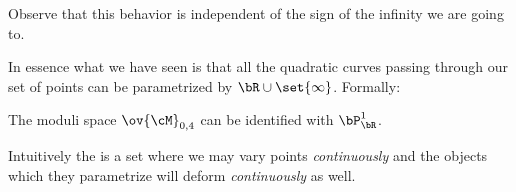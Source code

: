 \documentclass[12pt]{memoir}
\begin{document}
Observe that this behavior is independent of the sign of the infinity we are going to.\par 
In essence what we have seen is that all the quadratic curves passing through our set of points can be parametrized by $\bR\cup\set{\infty}$. Formally:
\begin{Prop}
The moduli space $\ov{\cM}_{0,4}$ can be identified with $\bP^1_\bR$.
\end{Prop}
Intuitively the  is a set where we may vary points \emph{continuously} and the objects which they parametrize will deform \emph{continuously} as well.
\end{document}

